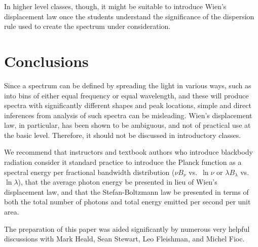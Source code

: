 \documentclass[12pt,aps,prb,preprint]{revtex4}   %
\begin{document}
In higher level classes, though, it might be suitable to introduce Wien's displacement law once the
students understand the significance of the dispersion rule used to create the spectrum under consideration.

\section{Conclusions}

Since a spectrum can be defined by spreading the light in various ways, such as into bins of either equal frequency or equal wavelength, and these will produce spectra with significantly different shapes and peak locations, simple and direct inferences from analysis of such spectra can be misleading.  Wien's displacement law, in particular, has been shown to be ambiguous, and not of practical use at the basic level.  Therefore, it should not be discussed in introductory classes.

We recommend that instructors and textbook authors who introduce blackbody radiation consider it standard practice to introduce the Planck function as a spectral energy per fractional bandwidth distribution 
($\nu B_\nu$ vs.\ $\ln\nu$ or $\lambda B_\lambda$ vs.\ $\ln\lambda$), that the average photon energy be presented in lieu of Wien's displacement law, and that the Stefan-Boltzmann law be presented in terms of both the total number of photons and total energy emitted per second per unit area.

\begin{acknowledgments}
The preparation of this paper was aided significantly by numerous very helpful discussions with Mark Heald, Sean Stewart, Leo Fleishman, and Michel Fioc.
\end{acknowledgments}
\end{document}
